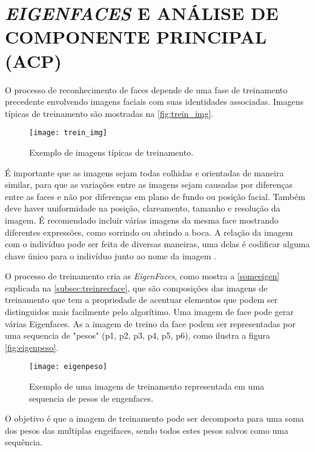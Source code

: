 \section{\textit{EIGENFACES} E ANÁLISE DE COMPONENTE PRINCIPAL (ACP) }\label{sec:recog_faces}

O processo de reconhecimento de faces depende de uma fase de treinamento precedente envolvendo imagens faciais com suas identidades associadas. Imagens típicas de treinamento são mostradas na \autoref{fig:trein_img}.
\begin{figure}[h]
	\centering
	\texttt{[image: trein\_img]}
	\caption{Exemplo de imagens típicas de treinamento.}
	\label{fig:trein_img}
\end{figure}

É importante que as imagens sejam todas colhidas e orientadas de maneira similar, para que as variações entre as imagens sejam causadas por diferenças entre as faces e não por diferenças  em plano de fundo ou posição facial. Também deve haver uniformidade na posição, clareamento, tamanho e resolução da imagem. É recomendado incluir várias imagens da mesma face mostrando diferentes expressões, como sorrindo ou abrindo a boca. A relação da imagem com o indivíduo pode ser feita de diversas maneiras, uma delas é codificar alguma chave único para o indivíduo junto ao nome da imagem \cite{drmathew_java_programming}. 



O processo de treinamento cria as \textit{EigenFaces}, como mostra a \autoref{someeigen} explicada na  \autoref{subsec:treinrecface}, que são composições das imagens de treinamento que tem a propriedade de acentuar elementos que podem ser distinguidos mais facilmente pelo algorítimo. Uma imagem de face pode gerar várias Eigenfaces. As a imagem de treino da face podem ser representadas por uma sequencia de "pesos" (p1, p2, p3, p4, p5, p6), como ilustra a figura \autoref{fig:eigenpeso}.
\begin{figure}[h]
	\centering
	\texttt{[image: eigenpeso]}
	\caption{Exemplo de uma imagem de treinamento representada em uma sequencia de pesos de engenfaces.}
	\label{fig:eigenpeso}
\end{figure}

O objetivo é que a imagem de treinamento pode ser decomposta para uma soma dos pesos das multiplas engeifaces, sendo todos estes pesos salvos como uma sequência.

